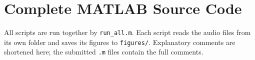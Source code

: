 \documentclass[12pt, a4paper]{article}
\begin{document}
\appendix
\section{Complete MATLAB Source Code}

All scripts are run together by \texttt{run\_all.m}. Each script reads the audio files from its own folder and saves its figures to \texttt{figures/}. Explanatory comments are shortened here; the submitted \texttt{.m} files contain the full comments.






\end{document}
